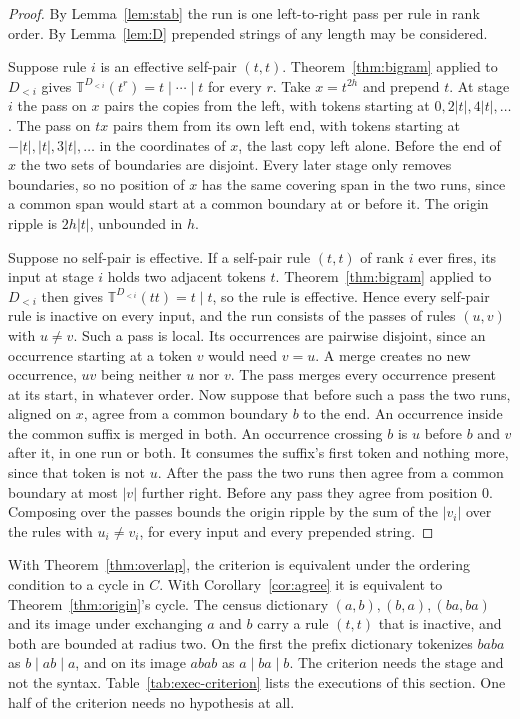 \documentclass[11pt,a4paper]{article}
\theoremstyle{definition}
\theoremstyle{plain}
\newcommand{\T}{\mathbb{T}}
\begin{document}
\begin{proof}
By Lemma~\ref{lem:stab} the run is one left-to-right pass per rule in rank order. By Lemma~\ref{lem:D} prepended strings
of any length may be considered.

Suppose rule \(i\) is an effective self-pair \((t, t)\). Theorem~\ref{thm:bigram} applied to \(D_{<i}\) gives
\(\T^{D_{<i}}(t^r) = t \mid \cdots \mid t\) for every \(r\). Take \(x = t^{2h}\) and prepend \(t\). At stage \(i\) the
pass on \(x\) pairs the copies from the left, with tokens starting at \(0, 2|t|, 4|t|, \dots\). The pass on \(tx\) pairs
them from its own left end, with tokens starting at \(-|t|, |t|, 3|t|, \dots\) in the coordinates of \(x\), the last
copy left alone. Before the end of \(x\) the two sets of boundaries are disjoint. Every later stage only removes
boundaries, so no position of \(x\) has the same covering span in the two runs, since a common span would start at a
common boundary at or before it. The origin ripple is \(2h|t|\), unbounded in \(h\).

Suppose no self-pair is effective. If a self-pair rule \((t, t)\) of rank \(i\) ever fires, its input at stage \(i\)
holds two adjacent tokens \(t\). Theorem~\ref{thm:bigram} applied to \(D_{<i}\) then gives
\(\T^{D_{<i}}(tt) = t \mid t\), so the rule is effective. Hence every self-pair rule is inactive on every input, and the
run consists of the passes of rules \((u, v)\) with \(u \ne v\). Such a pass is local. Its occurrences are pairwise
disjoint, since an occurrence starting at a token \(v\) would need \(v = u\). A merge creates no new occurrence, \(uv\)
being neither \(u\) nor \(v\). The pass merges every occurrence present at its start, in whatever order. Now suppose
that before such a pass the two runs, aligned on \(x\), agree from a common boundary \(b\) to the end. An occurrence
inside the common suffix is merged in both. An occurrence crossing \(b\) is \(u\) before \(b\) and \(v\) after it, in
one run or both. It consumes the suffix's first token and nothing more, since that token is not \(u\). After the pass
the two runs then agree from a common boundary at most \(|v|\) further right. Before any pass they agree from position
\(0\). Composing over the passes bounds the origin ripple by the sum of the \(|v_i|\) over the rules with
\(u_i \ne v_i\), for every input and every prepended string.
\end{proof}

With Theorem~\ref{thm:overlap}, the criterion is equivalent under the ordering condition to a cycle in \(C\). With
Corollary~\ref{cor:agree} it is equivalent to Theorem~\ref{thm:origin}'s cycle. The census dictionary
\((a, b), (b, a), (ba, ba)\) and its image under exchanging \(a\) and \(b\) carry a rule \((t, t)\) that is inactive,
and both are bounded at radius two. On the first the prefix dictionary tokenizes \(baba\) as \(b \mid ab \mid a\), and
on its image \(abab\) as \(a \mid ba \mid b\). The criterion needs the stage and not the syntax.
Table~\ref{tab:exec-criterion} lists the executions of this section. One half of the criterion needs no hypothesis at
all.
\end{document}
